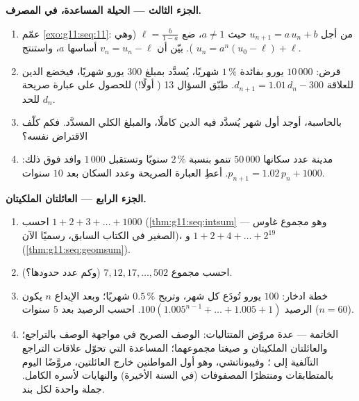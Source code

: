 \begin{problem}
\medskip
\noindent\textbf{الجزء الثالث --- الحيلة المساعدة، في
المصرف.}
\begin{enumerate}[resume]
  \item عمّم \cref{exo:g11:seq:11}: من أجل
        $u_{n+1} = a\,u_n + b$ حيث $a \neq 1$، ضع
        $\ell = \frac{b}{1 - a}$ (وهي ). بيّن أن
        $v_n = u_n - \ell$  أساسها $a$، واستنتج
        $u_n = a^n (u_0 - \ell) + \ell$.
  \item قرض: $10\,000$ يورو بفائدة $1\,\%$ شهريًا،
        يُسدَّد بمبلغ $300$ يورو شهريًا، فيخضع الدين للعلاقة
        $d_{n+1} = 1.01\,d_n - 300$. طبّق السؤال 13 ( أولًا!) للحصول على عبارة صريحة للحد $d_n$.
  \item بالحاسبة، أوجد أول شهر يُسدَّد فيه الدين
        كاملًا، والمبلغ الكلي المسدَّد. فكم كلّف
        الاقتراض نفسه؟
  \item مدينة عدد سكانها $50\,000$ تنمو بنسبة $2\,\%$ سنويًا
        وتستقبل $1\,000$ وافد فوق ذلك:
        $p_{n+1} = 1.02\,p_n + 1000$. أعطِ العبارة الصريحة
        وعدد السكان بعد $10$ سنوات.
\end{enumerate}

\medskip
\noindent\textbf{الجزء الرابع --- العائلتان الملكيتان.}
\begin{enumerate}[resume]
  \item احسب $1 + 2 + 3 + \dots + 1000$
        (\cref{thm:g11:seq:intsum} --- وهو مجموع غاوس الصغير في
        الكتاب السابق، رسميًا الآن)، و
        $1 + 2 + 4 + \dots + 2^{19}$
        (\cref{thm:g11:seq:geomsum}).
  \item احسب مجموع 
        $7, 12, 17, \dots, 502$ (وكم عدد حدودها؟).
  \item خطة ادخار: $100$ يورو تُودَع كل شهر، وتربح
        $0.5\,\%$ شهريًا؛ وبعد الإيداع $n$ يكون الرصيد
        $100\left(1.005^{n-1} + \dots + 1.005 + 1\right)$.
        احسب الرصيد بعد $5$ سنوات ($n = 60$).
  \item الخاتمة --- عدة مروّض المتتاليات: الوصف الصريح في مواجهة
        الوصف بالتراجع؛ والعائلتان الملكيتان و
        صيغتا مجموعهما؛  المساعدة التي تحوّل
        علاقات التراجع التآلفية إلى ؛ وفيبوناتشي،
        وهو أول المواطنين خارج العائلتين، مروَّضًا اليوم
        بالمتطابقات ومنتظرًا المصفوفات (في السنة الأخيرة) والنهايات
        لأسره الكامل. جملة واحدة لكل بند.
\end{enumerate}
\end{problem}
